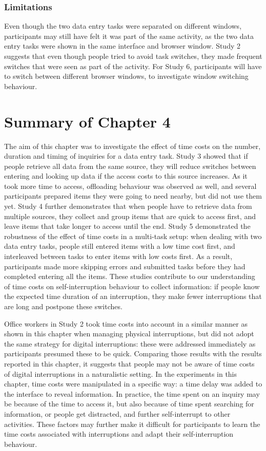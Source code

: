 \subsubsection{Limitations}
Even though the two data entry tasks were separated on different windows, participants may still have felt it was part of the same activity, as the two data entry tasks were shown in the same interface and browser window. Study 2 suggests that even though people tried to avoid task switches, they  made frequent switches that were seen as part of the activity. For Study 6, participants will have to switch between different browser windows, to investigate window switching behaviour. 

\section{Summary of Chapter 4}
The aim of this chapter was to investigate the effect of time costs on the number, duration and timing of inquiries for a data entry task. Study 3 showed that if people retrieve all data from the same source, they will reduce switches between entering and looking up data if the access costs to this source increases. As it took more time to access, offloading behaviour was observed as well, and several participants prepared items they were going to need nearby, but did not use them yet. Study 4 further demonstrates that when people have to retrieve data from multiple sources, they collect and group items that are quick to access first, and leave items that take longer to access until the end. Study 5 demonstrated the robustness of the effect of time costs in a multi-task setup: when dealing with two data entry tasks, people still entered items with a low time cost first, and interleaved between tasks to enter items with low costs first. As a result, participants made more skipping errors and submitted tasks before they had completed entering all the items. These studies contribute to our understanding of time costs on self-interruption behaviour to collect information: if people know the expected time duration of an interruption, they make fewer interruptions that are long and postpone these switches. 

Office workers in Study 2 took time costs into account in a similar manner as shown in this chapter when managing physical interruptions, but did not adopt the same strategy for digital interruptions: these were addressed immediately as participants presumed these to be quick. Comparing those results with the results reported in this chapter, it suggests that people may not be aware of time costs of digital interruptions in a naturalistic setting. In the experiments in this chapter, time costs were manipulated in a specific way: a time delay was added to the interface to reveal information. In practice, the time spent on an inquiry may be because of the time to access it, but also because of time spent searching for information, or people get distracted, and further self-interrupt to other activities. These factors may further make it difficult for participants to learn the time costs associated with interruptions and adapt their self-interruption behaviour. 

